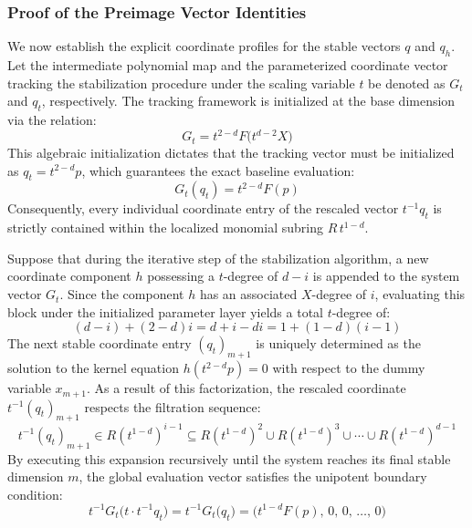 \documentclass[11pt,a4paper]{article}
\begin{document}
\subsubsection{Proof of the Preimage Vector Identities}

We now establish the explicit coordinate profiles for the stable vectors $q$ and $q_h$. Let the intermediate polynomial map and the parameterized coordinate vector tracking the stabilization procedure under the scaling variable $t$ be denoted as $G_t$ and $q_t$, respectively. The tracking framework is initialized at the base dimension via the relation:
\begin{equation}
G_t = t^{2-d} F\big(t^{d-2} X\big)
\end{equation}
This algebraic initialization dictates that the tracking vector must be initialized as $q_t = t^{2-d} p$, which guarantees the exact baseline evaluation:
\begin{equation}
G_t(q_t) = t^{2-d} F(p)
\end{equation}
Consequently, every individual coordinate entry of the rescaled vector $t^{-1} q_t$ is strictly contained within the localized monomial subring $R\, t^{1-d}$.

Suppose that during the iterative step of the stabilization algorithm, a new coordinate component $h$ possessing a $t$-degree of $d - i$ is appended to the system vector $G_t$. Since the component $h$ has an associated $X$-degree of $i$, evaluating this block under the initialized parameter layer yields a total $t$-degree of:
\begin{equation}
(d - i) + (2 - d) i = d + i - d i = 1 + (1 - d)(i - 1)
\end{equation}
The next stable coordinate entry $(q_t)_{m+1}$ is uniquely determined as the solution to the kernel equation $h(t^{2-d} p) = 0$ with respect to the dummy variable $x_{m+1}$. As a result of this factorization, the rescaled coordinate $t^{-1} (q_t)_{m+1}$ respects the filtration sequence:
\begin{equation}
t^{-1} (q_t)_{m+1} \in R (t^{1-d})^{i-1} \subseteq R (t^{1-d})^2 \cup R (t^{1-d})^3 \cup \cdots \cup R (t^{1-d})^{d-1}
\end{equation}
By executing this expansion recursively until the system reaches its final stable dimension $m$, the global evaluation vector satisfies the unipotent boundary condition:
\begin{equation}
t^{-1} G_t \big(t \cdot t^{-1} q_t\big) = t^{-1} G_t \big(q_t\big) = \big(t^{1-d} F(p), \, 0, \, 0, \, \dots, \, 0\big)
\end{equation}
\end{document}
